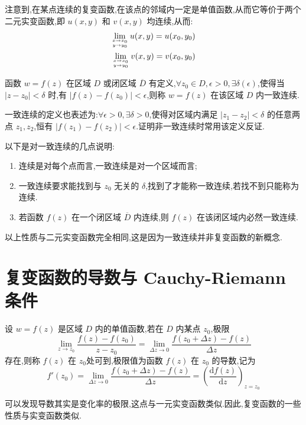 \documentclass[UTF8]{ctexbook}
\newcommand{\D}{\text{d}}
\newcommand{\derivative}[2]{\frac{\D #1}{\D #2}}
\begin{document}
注意到,在某点连续的复变函数,在该点的邻域内一定是单值函数,从而它等价于两个二元实变函数,即 $u(x,y)$ 和 $v(x,y)$ 均连续,从而:
\begin{align*}
    \lim_{x\to x_0 \atop y\to y_0}u(x,y)=u(x_0,y_0) \\
    \lim_{x\to x_0 \atop y\to y_0}v(x,y)=v(x_0,y_0)
\end{align*}

\begin{definition}[一致连续]
    函数 $w=f(z)$ 在区域 $D$ 或闭区域 $\overline{D}$ 有定义,$\forall z_0\in D,\epsilon>0,\exists\delta(\epsilon)$,使得当 $|z-z_0|<\delta$ 时,有 $|f(z)-f(z_0)|<\epsilon$,则称 $w=f(z)$ 在该区域 $D$ 内一致连续.

    一致连续的定义也表述为:$\forall\epsilon>0,\exists\delta>0$,使得对区域内满足 $|z_1-z_2|<\delta$ 的任意两点 $z_1,z_2$,恒有 $|f(z_1)-f(z_2)|<\epsilon$.证明非一致连续时常用该定义反证.
\end{definition}

以下是对一致连续的几点说明:
\begin{enumerate}
    \item 连续是对每个点而言,一致连续是对一个区域而言;
    \item 一致连续要求能找到与 $z_0$ 无关的 $\delta$,找到了才能称一致连续,若找不到只能称为连续.
    \item 若函数 $f(z)$ 在一个闭区域 $\overline{D}$ 内连续,则 $f(z)$ 在该闭区域内必然一致连续.
\end{enumerate}

以上性质与二元实变函数完全相同,这是因为一致连续并非复变函数的新概念.

\section{复变函数的导数与 Cauchy-Riemann 条件}

\begin{definition}
    设 $w=f(z)$ 是区域 $D$ 内的单值函数,若在 $D$ 内某点 $z_0$,极限
    \[
    \lim_{z\to z_0}\frac{f(z)-f(z_0)}{z-z_0} = \lim_{\Delta z\to 0} \frac{f(z_0+\Delta z)-f(z)}{\Delta z}
    \]
    存在,则称 $f(z)$ 在 $z_0$处可到,极限值为函数 $f(z)$ 在 $z_0$ 的导数,记为
    \[
    f'(z_0) = \lim_{\Delta z\to 0}\frac{f(z_0+\Delta z)-f(z)}{\Delta z}=\left( \derivative{f(z)}{z} \right)_{z=z_0}
    \]
\end{definition}

可以发现导数其实是变化率的极限,这点与一元实变函数类似.因此,复变函数的一些性质与实变函数类似.
\end{document}
